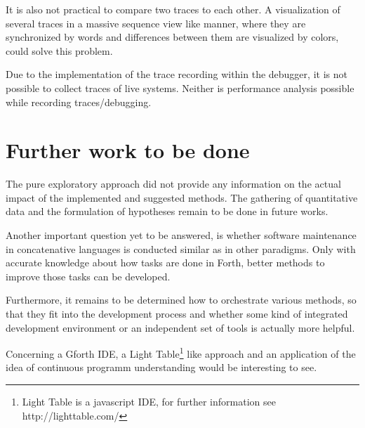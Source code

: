 It is also not practical to compare two traces to each other. A visualization of several traces in a massive sequence view like manner, where they are synchronized by words and differences between them are visualized by colors, could solve this problem.

Due to the implementation of the trace recording within the debugger, it is not possible to collect traces of live systems. Neither is performance analysis possible while recording traces/debugging.
 

\section{Further work to be done}

The pure exploratory approach did not provide any information on the actual impact of the implemented and suggested methods. The gathering of quantitative data and the formulation of hypotheses remain to be done in future works.

Another important question yet to be answered, is whether software maintenance in concatenative languages is conducted similar as in other paradigms. Only with accurate knowledge about how tasks are done in Forth, better methods to improve those tasks can be developed.

Furthermore, it remains to be determined how to orchestrate various methods, so that they fit into the development process and whether some kind of integrated development environment or an independent set of tools is actually more helpful.

Concerning a Gforth IDE, a Light Table\footnote{Light Table is a javascript IDE, for further information see http://lighttable.com/} like approach and an application of the idea of continuous programm understanding\cite{Muller:2000:RER:336512.336526} would be interesting to see.


